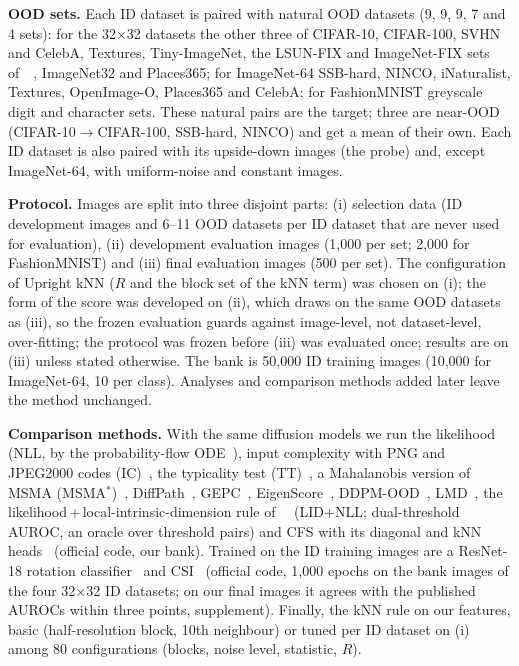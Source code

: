 \documentclass{article}
\begin{document}
\textbf{OOD sets.} Each ID dataset is paired with natural OOD datasets (9, 9, 9, 7 and 4 sets): for the 32$\times$32 datasets the other three of CIFAR-10, CIFAR-100, SVHN and CelebA, Textures, Tiny-ImageNet, the LSUN-FIX and ImageNet-FIX sets of~\citeauthor{tack2020csi}~, ImageNet32 and Places365; for ImageNet-64 SSB-hard, NINCO, iNaturalist, Textures, OpenImage-O, Places365 and CelebA; for FashionMNIST greyscale digit and character sets. These \nNatPairsMain{} natural pairs are the target; three are near-OOD (CIFAR-10$\to$CIFAR-100, SSB-hard, NINCO) and get a mean of their own. Each ID dataset is also paired with its upside-down images (the probe) and, except ImageNet-64, with uniform-noise and constant images.

\textbf{Protocol.} Images are split into three disjoint parts: (i) selection data (ID development images and 6--11 OOD datasets per ID dataset that are never used for evaluation), (ii) development evaluation images (1{,}000 per set; 2{,}000 for FashionMNIST) and (iii) final evaluation images (500 per set). The configuration of Upright kNN ($R$ and the block set of the kNN term) was chosen on (i); the form of the score was developed on (ii), which draws on the same OOD datasets as (iii), so the frozen evaluation guards against image-level, not dataset-level, over-fitting; the protocol was frozen before (iii) was evaluated once; results are on (iii) unless stated otherwise. The bank is 50{,}000 ID training images (10{,}000 for ImageNet-64, 10 per class). Analyses and comparison methods added later leave the method unchanged.

\textbf{Comparison methods.} With the same diffusion models we run the likelihood (NLL, by the probability-flow ODE~\cite{song2021score}), input complexity with PNG and JPEG2000 codes (IC)~\cite{serra2020input}, the typicality test (TT)~\cite{nalisnick2019typ}, a Mahalanobis version of MSMA (MSMA$^{*}$)~\cite{mahmood2021msma}, DiffPath~\cite{heng2024diffpath}, GEPC~\cite{alexis2026gepc}, EigenScore~\cite{shoushtari2026eigenscore}, DDPM-OOD~\cite{graham2023ddpmood}, LMD~\cite{liu2023lmd}, the likelihood\,+\,local-intrinsic-dimension rule of~\citeauthor{kamkari2024geometric}~ (LID+NLL; dual-threshold AUROC, an oracle over threshold pairs) and CFS with its diagonal and kNN heads~\cite{rouzoumka2026cfs} (official code, our bank). Trained on the ID training images are a ResNet-18 rotation classifier~\cite{hendrycks2019ss} and CSI~\cite{tack2020csi} (official code, 1{,}000 epochs on the bank images of the four 32$\times$32 ID datasets; on our final images it agrees with the published AUROCs within three points, supplement). Finally, the kNN rule on our features, basic (half-resolution block, 10th neighbour) or tuned per ID dataset on (i) among 80 configurations (blocks, noise level, statistic, $R$).
\end{document}
